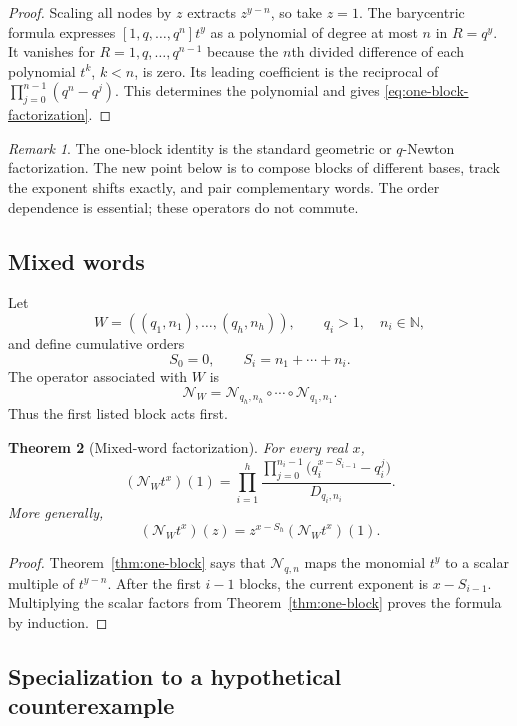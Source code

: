 \documentclass[11pt,oneside]{article}
\newtheorem{theorem}{Theorem}[section]
\theoremstyle{definition}
\theoremstyle{remark}
\newtheorem{remark}[theorem]{Remark}
\newcommand{\N}{\mathbb N}
\begin{document}
\begin{proof}
Scaling all nodes by $z$ extracts $z^{y-n}$, so take $z=1$.  The barycentric formula expresses
$[1,q,\ldots,q^n]t^y$ as a polynomial of degree at most $n$ in $R=q^y$.  It vanishes for
$R=1,q,\ldots,q^{n-1}$ because the $n$th divided difference of each polynomial
$t^k$, $k<n$, is zero.  Its leading coefficient is the reciprocal of
$\prod_{j=0}^{n-1}(q^n-q^j)$.  This determines the polynomial and gives
\eqref{eq:one-block-factorization}.
\end{proof}

\begin{remark}
The one-block identity is the standard geometric or $q$-Newton factorization.  The new point
below is to compose blocks of different bases, track the exponent shifts exactly, and pair
complementary words.  The order dependence is essential; these operators do not commute.
\end{remark}

\subsection{Mixed words}

Let
\[
 W=((q_1,n_1),\ldots,(q_h,n_h)),
 \qquad q_i>1,
 \quad n_i\in\N,
\]
and define cumulative orders
\[
 S_0=0,
 \qquad
 S_i=n_1+\cdots+n_i.
\]
The operator associated with $W$ is
\[
 \mathcal N_W=
 \mathcal N_{q_h,n_h}\circ\cdots\circ\mathcal N_{q_1,n_1}.
\]
Thus the first listed block acts first.

\begin{theorem}[Mixed-word factorization]
\label{thm:mixed-word}
For every real $x$,
\begin{equation}
 (\mathcal N_W t^x)(1)
 =\prod_{i=1}^h
 \frac{\displaystyle\prod_{j=0}^{n_i-1}
       \bigl(q_i^{x-S_{i-1}}-q_i^j\bigr)}
      {D_{q_i,n_i}}.
 \label{eq:mixed-word-factorization}
\end{equation}
More generally,
\[
 (\mathcal N_W t^x)(z)
 =z^{x-S_h}(\mathcal N_W t^x)(1).
\]
\end{theorem}

\begin{proof}
Theorem~\ref{thm:one-block} says that $\mathcal N_{q,n}$ maps the monomial $t^y$ to a scalar
multiple of $t^{y-n}$.  After the first $i-1$ blocks, the current exponent is
$x-S_{i-1}$.  Multiplying the scalar factors from Theorem~\ref{thm:one-block} proves the
formula by induction.
\end{proof}

\subsection{Specialization to a hypothetical counterexample}
\end{document}
